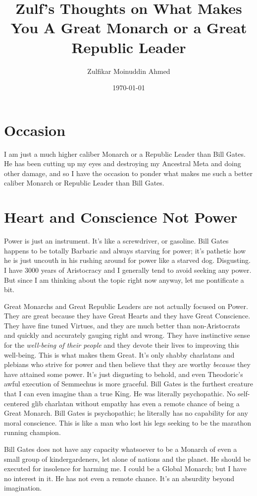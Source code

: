 \documentclass{amsart}
\title{Zulf's Thoughts on What Makes You A Great Monarch or a Great Republic Leader}
\author{Zulfikar Moinuddin Ahmed}
\date{\today}
\begin{document}
\maketitle

\section{Occasion}

I am just a much higher caliber Monarch or a Republic Leader than Bill Gates.  He has been cutting up my eyes and destroying my Ancestral Meta and doing other damage, and so I have the occasion to ponder what makes me such a better caliber Monarch or Republic Leader than Bill Gates.

\section{Heart and Conscience Not Power}

Power is just an instrument.  It's like a screwdriver, or gasoline.  Bill Gates happens to be totally Barbaric and always starving for power; it's pathetic how he is just uncouth in his rushing around for power like a starved dog.  Disgusting.  I have 3000 years of Aristocracy and I generally tend to avoid seeking any power.  But since I am thinking about the topic right now anyway, let me pontificate a bit.

Great Monarchs and Great Republic Leaders are not actually focused on Power.  They are great because they have Great Hearts and they have Great Conscience.  They have fine tuned Virtues, and they are much better than non-Aristocrats and quickly and accurately gauging right and wrong.  They have instinctive sense for the {\em well-being of their people} and they devote their lives to improving this well-being.  This is what makes them Great.  It's only shabby charlatans and plebians who strive for power and then believe that they are worthy {\em because} they have attained some power.  It's just disgusting to behold, and even Theodoric's awful execution of Semmechus is more graceful.  Bill Gates is the furthest creature that I can even imagine than a true King.  He was literally psychopathic.  No self-centered glib charlatan without empathy has even a remote chance of being a Great Monarch.  Bill Gates is psychopathic; he literally has no capability for any moral conscience.  This is like a man who lost his legs seeking to be the marathon running champion.
 
Bill Gates does not have any capacity whatsoever to be a Monarch of even a small group of kindergardeners, let alone of nations and the planet.  He should be executed for insolence for harming me.  I could be a Global Monarch; but I have no interest in it.  He has not even a remote chance.  It's an absurdity beyond imagination.  
\end{document}
